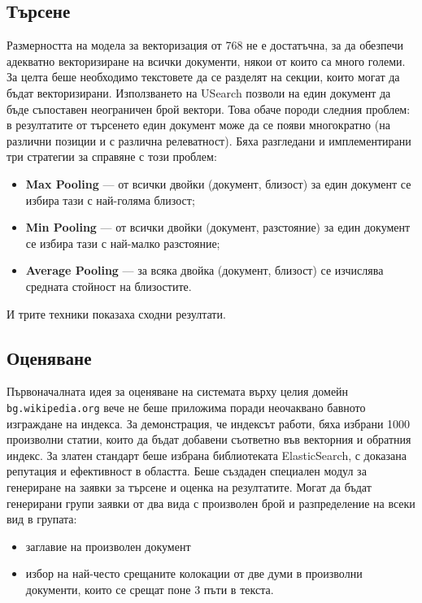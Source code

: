 \documentclass[a4paper,12pt]{article} \usepackage[utf8]{inputenc}
\begin{document}
\subsection{Търсене} Размерността на модела за векторизация от 768 не е
достатъчна, за да обезпечи адекватно векторизиране на всички документи, някои от
които са много големи. За целта беше необходимо текстовете да се разделят на
секции, които могат да бъдат векторизирани. Използването на
USearch\cite{usearch} позволи на един документ да бъде съпоставен неограничен
брой вектори. Това обаче породи следния проблем: в резултатите от търсенето един
документ може да се появи многократно (на различни позиции и с различна
релеватност). Бяха разгледани и имплементирани три стратегии за справяне с този
проблем: \begin{itemize} \item \textbf{Max Pooling} --- от всички двойки
(документ, близост) за един документ се избира тази с най-голяма близост; \item
\textbf{Min Pooling} --- от всички двойки (документ, разстояние) за един
документ се избира тази с най-малко разстояние; \item \textbf{Average Pooling}
--- за всяка двойка (документ, близост) се изчислява средната стойност на
близостите. \end{itemize} И трите техники показаха сходни резултати.

\subsection{Оценяване} Първоначалната идея за оценяване на системата върху
целия домейн \texttt{bg.wikipedia.org} вече не беше приложима поради неочаквано
бавното изграждане на индекса. За демонстрация, че индексът работи, бяха избрани
1000 произволни статии, които да бъдат добавени съответно във векторния и
обратния индекс. За златен стандарт беше избрана библиотеката ElasticSearch, с
доказана репутация и ефективност в областта. Беше създаден специален модул за
генериране на заявки за търсене и оценка на резултатите. Могат да бъдат
генерирани групи заявки от два вида с произволен брой и разпределение на всеки
вид в групата: \begin{itemize} \item заглавие на произволен документ \item избор
на най-често срещаните колокации от две думи в произволни документи, които се
срещат поне 3 пъти в текста. \end{itemize}
\end{document}
